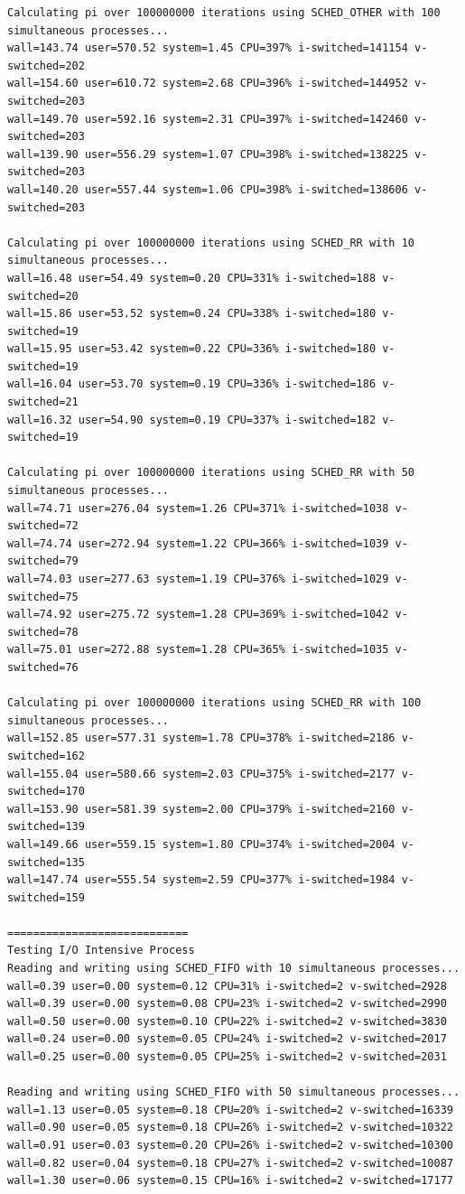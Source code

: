 \documentclass[12pt]{article}
\begin{document}
\begin{small}
\begin{verbatim}
Calculating pi over 100000000 iterations using SCHED_OTHER with 100 simultaneous processes...
wall=143.74 user=570.52 system=1.45 CPU=397% i-switched=141154 v-switched=202
wall=154.60 user=610.72 system=2.68 CPU=396% i-switched=144952 v-switched=203
wall=149.70 user=592.16 system=2.31 CPU=397% i-switched=142460 v-switched=203
wall=139.90 user=556.29 system=1.07 CPU=398% i-switched=138225 v-switched=203
wall=140.20 user=557.44 system=1.06 CPU=398% i-switched=138606 v-switched=203

Calculating pi over 100000000 iterations using SCHED_RR with 10 simultaneous processes...
wall=16.48 user=54.49 system=0.20 CPU=331% i-switched=188 v-switched=20
wall=15.86 user=53.52 system=0.24 CPU=338% i-switched=180 v-switched=19
wall=15.95 user=53.42 system=0.22 CPU=336% i-switched=180 v-switched=19
wall=16.04 user=53.70 system=0.19 CPU=336% i-switched=186 v-switched=21
wall=16.32 user=54.90 system=0.19 CPU=337% i-switched=182 v-switched=19

Calculating pi over 100000000 iterations using SCHED_RR with 50 simultaneous processes...
wall=74.71 user=276.04 system=1.26 CPU=371% i-switched=1038 v-switched=72
wall=74.74 user=272.94 system=1.22 CPU=366% i-switched=1039 v-switched=79
wall=74.03 user=277.63 system=1.19 CPU=376% i-switched=1029 v-switched=75
wall=74.92 user=275.72 system=1.28 CPU=369% i-switched=1042 v-switched=78
wall=75.01 user=272.88 system=1.28 CPU=365% i-switched=1035 v-switched=76

Calculating pi over 100000000 iterations using SCHED_RR with 100 simultaneous processes...
wall=152.85 user=577.31 system=1.78 CPU=378% i-switched=2186 v-switched=162
wall=155.04 user=580.66 system=2.03 CPU=375% i-switched=2177 v-switched=170
wall=153.90 user=581.39 system=2.00 CPU=379% i-switched=2160 v-switched=139
wall=149.66 user=559.15 system=1.80 CPU=374% i-switched=2004 v-switched=135
wall=147.74 user=555.54 system=2.59 CPU=377% i-switched=1984 v-switched=159

============================
Testing I/O Intensive Process
Reading and writing using SCHED_FIFO with 10 simultaneous processes...
wall=0.39 user=0.00 system=0.12 CPU=31% i-switched=2 v-switched=2928
wall=0.39 user=0.00 system=0.08 CPU=23% i-switched=2 v-switched=2990
wall=0.50 user=0.00 system=0.10 CPU=22% i-switched=2 v-switched=3830
wall=0.24 user=0.00 system=0.05 CPU=24% i-switched=2 v-switched=2017
wall=0.25 user=0.00 system=0.05 CPU=25% i-switched=2 v-switched=2031

Reading and writing using SCHED_FIFO with 50 simultaneous processes...
wall=1.13 user=0.05 system=0.18 CPU=20% i-switched=2 v-switched=16339
wall=0.90 user=0.05 system=0.18 CPU=26% i-switched=2 v-switched=10322
wall=0.91 user=0.03 system=0.20 CPU=26% i-switched=2 v-switched=10300
wall=0.82 user=0.04 system=0.18 CPU=27% i-switched=2 v-switched=10087
wall=1.30 user=0.06 system=0.15 CPU=16% i-switched=2 v-switched=17177


\end{verbatim}
\end{small}
\end{document}
